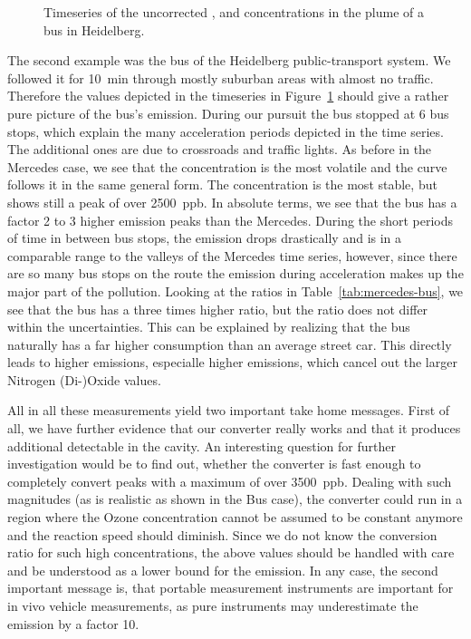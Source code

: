 \begin{figure}[htbp]
  \centering
  
  \caption{Timeseries of the uncorrected ,  and 
    concentrations in the plume of a bus in Heidelberg.}
  \label{fig:bus-ts}
\end{figure}

The second example was the bus of the Heidelberg public-transport
system. We followed it for \SI{10}{\minute} through mostly suburban
areas with almost no traffic. Therefore the values depicted in the
timeseries in Figure~\ref{fig:bus-ts} should give a rather pure
picture of the bus's emission. During our pursuit the bus stopped at 6
bus stops, which explain the many acceleration periods depicted in the
time series. The additional ones are due to crossroads and traffic
lights. As before in the Mercedes case, we see that the 
concentration is the most volatile and the  curve follows it
in the same general form. The  concentration is the most
stable, but shows still a peak of over \SI{2500}{ppb}. In absolute
terms, we see that the bus has a factor 2 to 3 higher 
emission peaks than the Mercedes. During the short periods of time in
between bus stops, the emission drops drastically and is in a
comparable range to the valleys of the Mercedes time series, however,
since there are so many bus stops on the route the emission during
acceleration makes up the major part of the pollution. Looking at the
ratios in Table~\ref{tab:mercedes-bus}, we see that the bus has a
three times higher  ratio, but the  ratio does not
differ within the uncertainties. This can be explained by realizing
that the bus naturally has a far higher consumption than an average
street car. This directly leads to higher emissions, especialle higher
 emissions, which cancel out the larger Nitrogen (Di-)Oxide
values.

All in all these measurements yield two important take home
messages. First of all, we have further evidence that our converter
really works and that it produces additional detectable  in
the cavity. An interesting question for further investigation would be
to find out, whether the converter is fast enough to completely
convert  peaks with a maximum of over \SI{3500}{ppb}. Dealing
with such magnitudes (as is realistic as shown in the Bus case), the
converter could run in a region where the Ozone concentration cannot
be assumed to be constant anymore and the reaction speed should
diminish. Since we do not know the conversion ratio for such high
concentrations, the above  values should be handled with care
and be understood as a lower bound for the emission. In any case, the
second important message is, that portable  measurement
instruments are important for in vivo vehicle measurements, as pure
 instruments may underestimate the  emission by a
factor 10.

